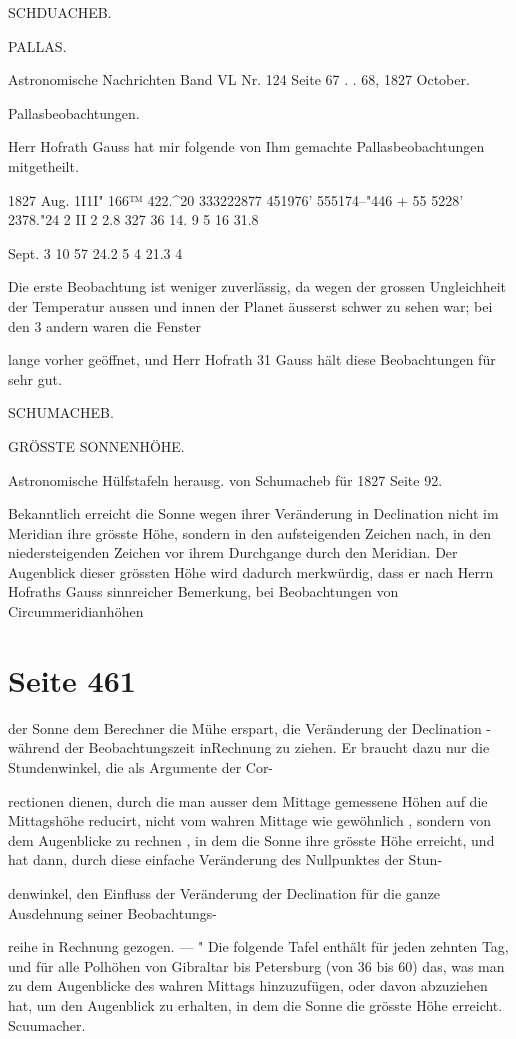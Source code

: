 \documentclass[10pt,a4paper]{article}
\begin{document}
SCHDUACHEB.

PALLAS.

Astronomische Nachrichten Band VL Nr. 124 Seite 67 . . 68, 1827 October.

Pallasbeobachtungen.

Herr Hofrath Gauss hat mir folgende von Ihm gemachte Pallasbeobachtungen mitgetheilt.

1827 Aug. 1I1I" 166™ 422.\textasciicircum{}20 333222877\textdegree{} 451976' 555174--"446 + 55\textdegree{} 5228' 2378."24 2 II 2 2.8 327 36 14. 9 5 16 31.8

Sept. 3 10 57 24.2 5 4 21.3 4

Die erste Beobachtung ist weniger zuverlässig, da wegen der grossen Ungleichheit der Temperatur aussen und innen der Planet äusserst schwer zu sehen war; bei den 3 andern waren die Fenster

lange vorher geöffnet, und Herr Hofrath 31 Gauss hält diese Beobachtungen für sehr gut.

SCHUMACHEB.

GRÖSSTE SONNENHÖHE.

Astronomische Hülfstafeln herausg. von Schumacheb für 1827 Seite 92.

Bekanntlich erreicht die Sonne wegen ihrer Veränderung in Declination nicht im Meridian ihre grösste Höhe, sondern in den aufsteigenden Zeichen nach, in den niedersteigenden Zeichen vor ihrem Durchgange durch den Meridian. Der Augenblick dieser grössten Höhe wird dadurch merkwürdig, dass er nach Herrn Hofraths Gauss sinnreicher Bemerkung, bei Beobachtungen von Circummeridianhöhen


\newpage
\section*{Seite 461}
der Sonne dem Berechner die Mühe erspart, die Veränderung der Declination -während der Beobachtungszeit inRechnung zu ziehen. Er braucht dazu nur die Stundenwinkel, die als Argumente der Cor-

rectionen dienen, durch die man ausser dem Mittage gemessene Höhen auf die Mittagshöhe reducirt, nicht vom wahren Mittage wie gewöhnlich , sondern von dem Augenblicke zu rechnen , in dem die Sonne ihre grösste Höhe erreicht, und hat dann, durch diese einfache Veränderung des Nullpunktes der Stun-

denwinkel, den Einfluss der Veränderung der Declination für die ganze Ausdehnung seiner Beobachtungs-

reihe in Rechnung gezogen. — " Die folgende Tafel enthält für jeden zehnten Tag, und für alle Polhöhen von Gibraltar bis Petersburg (von 36\textdegree{} bis 60\textdegree{}) das, was man zu dem Augenblicke des wahren Mittags hinzuzufügen, oder davon abzuziehen hat, um den Augenblick zu erhalten, in dem die Sonne die grösste Höhe erreicht. Scuumacher.
\end{document}
